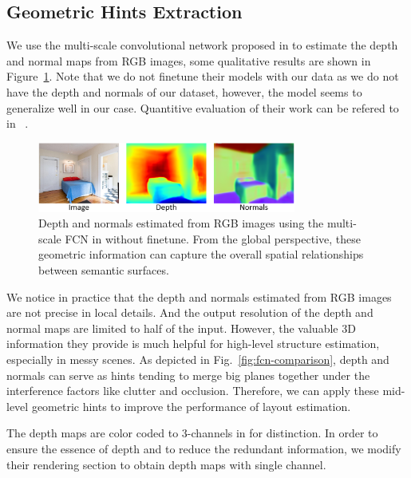 \subsection{Geometric Hints Extraction}
\label{sec:depth_normal}

We use the multi-scale convolutional network proposed in \cite{eigen2015predicting} to estimate the depth and normal maps from RGB images, some qualitative results are shown in Figure~\ref{fig:depthandnormal}. Note that we do not finetune their models with our data as we do not have the depth and normals of our dataset, however, the model seems to generalize well in our case. Quantitive evaluation of their work can be refered to in ~\cite{eigen2015predicting}.
%

\begin{figure}
	\centering
	\includegraphics[width=8.5cm]{figure/DN.png}
	\caption{Depth and normals estimated from RGB images using the multi-scale FCN in \cite{eigen2015predicting} without finetune. From the global perspective, these geometric information can capture the overall spatial relationships between semantic surfaces. }
	\label{fig:depthandnormal}
\end{figure}

We notice in practice that the depth and normals estimated from RGB images are not precise in local details. And the output resolution of the depth and normal maps are limited to half of the input. However, the valuable 3D information they provide is much helpful for high-level structure estimation, especially in messy scenes.  
%
As depicted in Fig.~\ref{fig:fcn-comparison}, depth and normals can serve as hints tending to merge big planes together under the interference factors like clutter and occlusion. 
%
Therefore, we can apply these mid-level geometric hints to improve the performance of layout estimation. 
%


The depth maps are color coded to 3-channels in \cite{eigen2015predicting} for distinction. In order to ensure the essence of depth and to reduce the redundant information, we modify their rendering section to obtain depth maps with single channel.

